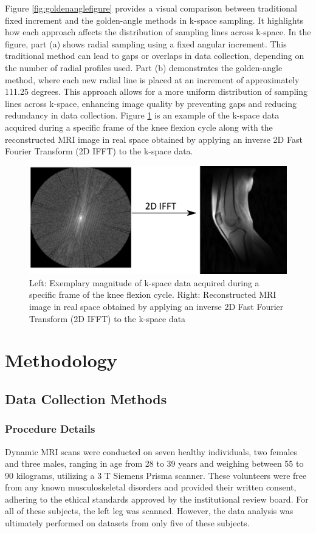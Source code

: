 \documentclass{micro-econ-thesis}
\begin{document}
 
Figure \ref{fig:goldenanglefigure} provides a visual comparison between traditional fixed increment and the golden-angle methods in k-space sampling. It highlights how each approach affects the distribution of sampling lines across k-space. In the figure, part (a) shows radial sampling using a fixed angular increment. This traditional method can lead to gaps or overlaps in data collection, depending on the number of radial profiles used. Part (b) demonstrates the golden-angle method, where each new radial line is placed at an increment of approximately 111.25 degrees. This approach allows for a more uniform distribution of sampling lines across k-space, enhancing image quality by preventing gaps and reducing redundancy in data collection. Figure \ref{fig:kspacearrow} is an example of the k-space data acquired during a specific frame of the knee flexion cycle along with  the reconstructed MRI image in real space obtained by applying an inverse 2D Fast Fourier Transform (2D IFFT) to the k-space data.
\begin{figure}[H]
	\centering
	\includegraphics[scale=0.3]{kspace_arrow_2}
	\caption{Left: Exemplary magnitude of k-space data acquired during a specific frame of the knee flexion cycle. Right: Reconstructed MRI image in real space obtained by applying an inverse 2D Fast Fourier Transform (2D IFFT) to the k-space data}
	\label{fig:kspacearrow}
\end{figure}
  


\section{Methodology}
\label{sec:second}

\subsection{Data Collection Methods}

\subsubsection{Procedure Details}
Dynamic MRI scans were conducted on seven healthy individuals, two females and three males, ranging in age from 28 to 39 years and weighing between 55 to 90 kilograms, utilizing a 3 T Siemens Prisma scanner. These volunteers were free from any known musculoskeletal disorders and provided their written consent, adhering to the ethical standards approved by the institutional review board. For all of these subjects, the left leg was scanned. However, the data analysis was ultimately performed on datasets from only five of these subjects.
\end{document}

